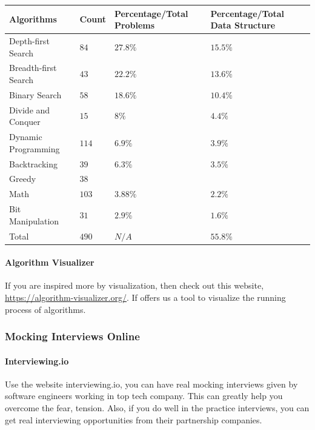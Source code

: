 \documentclass[../main.tex]{subfiles}
\begin{document}
\begin{itemize}
\begin{table}[h]
\label{tab: 1o_categories_2}
\centering
\noindent{}
 \noindent \begin{tabular}{|p{}|p{}| p{}| p{}|}
  \hline
 Algorithms & Count & Percentage/Total Problems & Percentage/Total Data Structure \\ \hline
Depth-first Search  & $84$& $27.8\%$ & $15.5\%$\\
Breadth-first Search   & $43$ & $22.2\%$ & $13.6\%$ \\
Binary Search  & $58$ & $18.6\%$ & $10.4\%$ \\ \hline
Divide and Conquer & $15$ & $8\%$ & $4.4\%$\\ 
Dynamic Programming & $114$ & $6.9\%$ & $3.9\%$\\ 
Backtracking  & $39$ & $6.3\%$ & $3.5\%$\\ 
Greedy & $38$\\ \hline
Math & $103$ & $3.88\%$ & $2.2\%$ \\
Bit Manipulation & $31$ & $2.9\%$ & $1.6\%$\\ \hline
Total & $490$ & $N/A$ & $55.8\%$\\ \hline
  \end{tabular}
\end{table}
\end{itemize}
\paragraph{Algorithm Visualizer} If you are inspired more by visualization, then check out this website, \url{https://algorithm-visualizer.org/}. If offers us a tool to visualize the running process of algorithms.
\subsubsection{Mocking Interviews Online}
\paragraph{Interviewing.io} Use the website interviewing.io, you can have real mocking interviews given by software engineers working in top tech company. This can greatly help you overcome the fear, tension. Also, if you do well in the practice interviews, you can get real interviewing opportunities from their partnership companies. 
\end{document}
